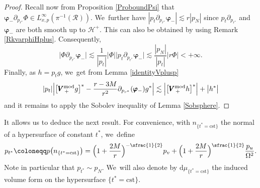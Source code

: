 \documentclass[10pt]{amsart}
\theoremstyle{plain}
\theoremstyle{definition}
\renewcommand\H{{\mathcal{H}^+}}
\newcommand\dr{{\mathrm{d}}}
\begin{document}
\begin{proof}
Recall now from Proposition \ref{ProboundPsi} that $\pmb{\varphi}_- \partial_{p_{r^*}} \Phi \in L^\infty_{x,p} (\pi^{-1}(\mathcal{R}))$. We~further have $|p_t\partial_{p_{r^*}} \pmb{\varphi}_-| \lesssim r|p_N|$ since $p_t \partial_{p_{r^*}}$ and $\pmb{\varphi}_-$ are both smooth up to $\H$. This can also be obtained by using Remark \ref{RkvarphiHplus}. Consequently,
\[
\big| \Phi \partial_{p_{r^*}} \pmb{\varphi}_- \big| \lesssim \frac{1}{|p_t|}|\Phi| \big| p_t \partial_{p_{r^*}} \pmb{\varphi}_- \big| \lesssim \frac{|p_N|}{|p_t|}|r\Phi| <+\infty.
\]
Finally, as $h=p_t g$, we~get from Lemma \ref{identityVplusp}
\[
|p_t| \Bigl | \bigl[ \pmb{V}_{\, +}^{ \mathrm{mod}} g \bigr]^* -\frac{r-3M}{r^2} \partial_{p_{r^*}}(\pmb{\varphi}_-) g^* \Bigr| \lesssim \Bigl | \bigl[ \pmb{V}_{\, +}^{ \mathrm{mod}} h \bigr]^* \Bigr|+\big|h^* \big|
\]
and it remains to apply the Sobolev inequality of Lemma \ref{Sobsphere}.
\end{proof}

It allows us to deduce the next result. For convenience, with $n_{\{t^*= \textrm{cst}\}}$ the normal of a hypersurface of constant $t^*$, we~define
\begin{equation}\label{eq:defnormal}
p_{t^*} \coloneqq p \bigl(n_{\{t^*= \textrm{cst} \}} \bigr) = \Bigl(1+\frac{2M}{r} \Bigr)^{-\sfrac{1}{2}} p_v+\Bigl(1+\frac{2M}{r}\Bigr)^{\sfrac{1}{2}}\frac{p_u}{\Omega^2}.
\end{equation}
Note in particular that $p_{t^*} \sim p_N$. We~will also denote by $\dr \mu_{\{ t^*=\textrm{cst}\} }$ the induced volume form on the hypersurface $\{ t^*=\textrm{cst}\}$.
\end{document}
